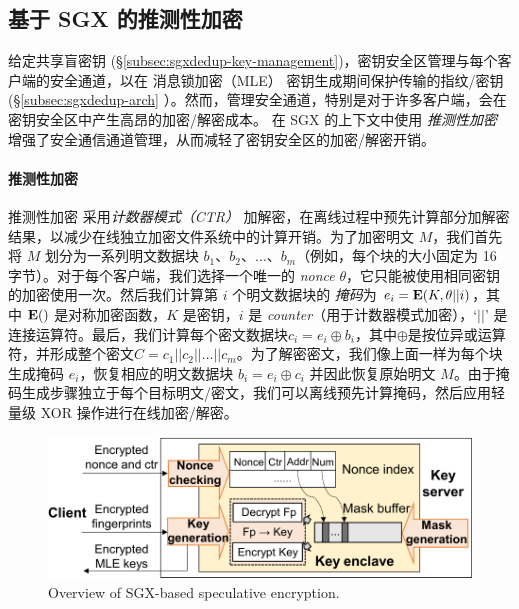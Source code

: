 \subsection{基于 SGX 的推测性加密}
\label{subsec:sgxdedup-encryption}

给定共享盲密钥 (\S\ref{subsec:sgxdedup-key-management})，密钥安全区管理与每个客户端的安全通道，以在 消息锁加密（MLE） 密钥生成期间保护传输的指纹/密钥 (\S\ref{subsec:sgxdedup-arch} ）。然而，管理安全通道，特别是对于许多客户端，会在密钥安全区中产生高昂的加密/解密成本。 \sysnameS 在 SGX 的上下文中使用 \textit{ 推测性加密} \cite{eduardo19} 增强了安全通信通道管理，从而减轻了密钥安全区的加密/解密开销。

\paragraph*{推测性加密} 推测性加密 \cite{eduardo19} 采用\textit{计数器模式（CTR）} \cite{counter} 加解密，在离线过程中预先计算部分加解密结果，以减少在线独立加密文件系统中的计算开销。为了加密明文 $M$，我们首先将 $M$ 划分为一系列明文数据块 $b_1、b_2、\ldots、b_m$（例如，每个块的大小固定为 16 字节）。对于每个客户端，我们选择一个唯一的 \textit{ nonce} $\theta$，它只能被使用相同密钥的加密使用一次。然后我们计算第 $i$ 个明文数据块的 \textit{掩码}为 $e_i = {\bf E}(K, \theta || i)$，其中 ${\bf E}()$ 是对称加密函数，$K$ 是密钥，$i$ 是 \textit{ counter}（用于计数器模式加密），`$||$' 是连接运算符。最后，我们计算每个密文数据块$c_i = e_i \oplus b_i $，其中$\oplus$是按位异或运算符，并形成整个密文$C = c_1 || c_2 || \ldots || c_m$。为了解密密文，我们像上面一样为每个块生成掩码 $e_i$，恢复相应的明文数据块 $b_i = e_i \oplus c_i$ 并因此恢复原始明文 $M$。由于掩码生成步骤独立于每个目标明文/密文，我们可以离线预先计算掩码，然后应用轻量级 XOR 操作进行在线加密/解密。

\begin{figure}[t]
\centering
\includegraphics[width=\textwidth]{pic/sgxdedup/encryption.pdf}
\caption{Overview of SGX-based speculative encryption.}
\label{fig:sgxdedup-SpecEnc}
\end{figure}


